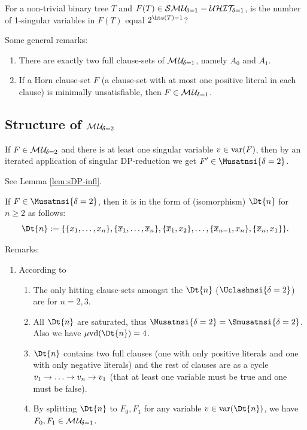 \documentclass{report}
\begin{document}
\begin{quest}\label{que:hitnum}
For a non-trivial binary tree $T$ and $F(T) \in \mathcal{S}\mathcal{M\hspace{0.8pt}U}_{\!\delta=1}=\mathcal{U}\mathcal{HIT}_{\!\!\delta=1}$, is the number of 1-singular variables in $F(T)$ equal $2^{\hts(T)-1}$?
\end{quest}

Some general remarks: 
  \begin{enumerate}
  \item There are exactly two full clause-sets of $\mathcal{M\hspace{0.8pt}U}_{\!\delta=1}$, namely $A_0$ and $A_1$.
  \item If a Horn clause-set $F$ (a clause-set with at most one positive literal in each clause) is minimally unsatisfiable, then $F \in \mathcal{M\hspace{0.8pt}U}_{\!\delta=1}$.
  \end{enumerate} 
\subsection{Structure of $\mathcal{M\hspace{0.8pt}U}_{\!\delta=2}$}
\label{sec:smu2}

\begin{lem}\label{lem:mu2-mup}
If $F \in \mathcal{M\hspace{0.8pt}U}_{\!\delta=2}$ and there is at least one singular variable $v \in \operatorname{var}(F)$, then by an iterated application of singular DP-reduction we get $F' \in \Musatnsi{\delta=2}$.
\end{lem}
\begin{prf}
See Lemma \ref{lem:sDP-infl}.
\end{prf}

\begin{lem}\label{lem:mu2-Fn}
\cite{KleineBuening2000SubclassesMU} If $F \in \Musatnsi{\delta=2}$, then it is in the form of (isomorphism) $\Dt{n}$  for $n \ge 2$ as follows:
  \begin{displaymath}
    \Dt{n} := \set{\set{x_1,\dots,x_n},\set{\ol x_1,\dots,\ol x_n},\set{\ol x_1,x_2}, \dots, \set{\ol x_{n-1},x_n}, \set{\ol x_n,x_1}}.
  \end{displaymath}

\end{lem}
Remarks:
  \begin{enumerate}
  \item According to \cite{KullmannZhao2010Extremal}
  \begin{enumerate}
  \item The only hitting clause-sets amongst the $\Dt{n}$ ($\Uclashnsi{\delta=2}$) are for $n=2,3$. 
  \item All $\Dt{n}$ are saturated, thus $\Musatnsi{\delta=2} = \Smusatnsi{\delta=2}$. Also we have $\minvdeg(\Dt{n}) = 4$. 
  \item $\Dt{n}$ contains two full clauses (one with only positive literals and one with only negative literals) and the rest of clauses are as a cycle $v_1 \ra \dots \ra v_n \ra v_1$ (that at least one variable must be true and one must be false).
  \item By splitting $\Dt{n}$ to $F_0, F_1$ for any variable $v \in \var(\Dt{n})$, we have $F_0, F_1 \in \mathcal{M\hspace{0.8pt}U}_{\!\delta=1} $.
  \end{enumerate} 
  \end{enumerate} 
  
\end{document}
